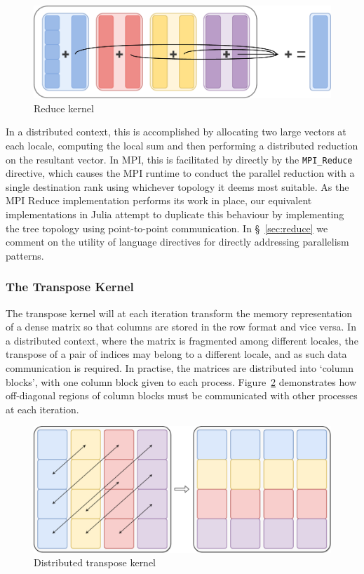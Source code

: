 \begin{figure}[htb]
  \includegraphics[width=\linewidth]{figs/Reduce.pdf}
  \caption{Reduce kernel}
  \label{fig:reduce-diagram}
\end{figure}

In a distributed context, this is accomplished by allocating two large
vectors at each locale, computing the local sum and then performing a
distributed reduction on the resultant vector. In MPI, this is
facilitated by directly by the \texttt{MPI\_Reduce} directive, which
causes the MPI runtime to conduct the parallel reduction with a single
destination rank using whichever topology it deems most suitable. As the
MPI Reduce implementation performs its work in place, our equivalent
implementations in Julia attempt to duplicate this behaviour by
implementing the tree topology using point-to-point communication. In
\S~\ref{sec:reduce} we comment on the utility of language
directives for directly addressing parallelism patterns.

\subsubsection{The Transpose Kernel}
\label{sec:transpose-kernel}

The transpose kernel will at each iteration transform the memory
representation of a dense matrix so that columns are stored in the row
format and vice versa. In a distributed context, where the matrix is
fragmented among different locales, the transpose of a pair of indices
may belong to a different locale, and as such data communication is
required. In practise, the matrices are distributed into `column
blocks', with one column block given to each process. Figure~\ref{fig:transpose-diagram} demonstrates how off-diagonal regions of
column blocks must be communicated with other processes at each
iteration.

\begin{figure}[htb]
  \includegraphics[width=\linewidth]{figs/Transpose.pdf}
  \caption{Distributed transpose kernel}
  \label{fig:transpose-diagram}
\end{figure}

